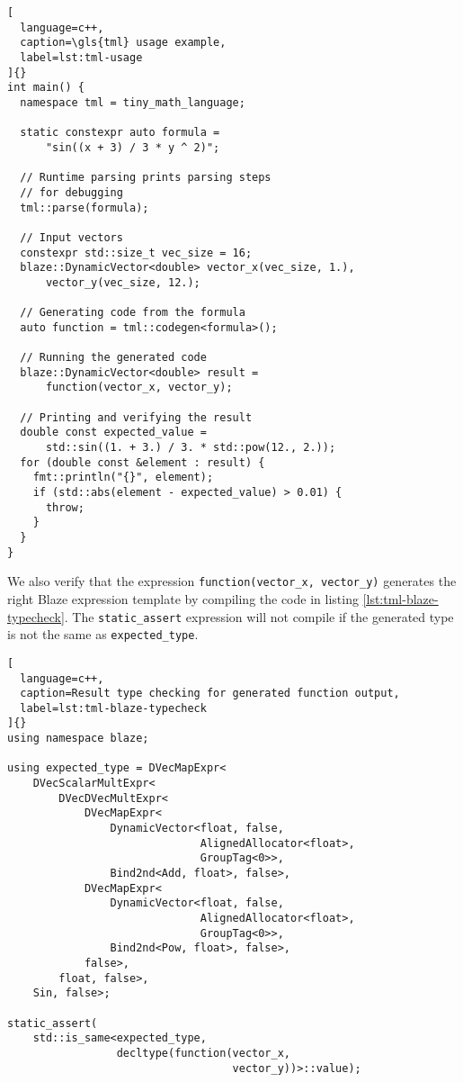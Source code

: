 \documentclass[../main]{subfiles}
\begin{document}
\begin{lstlisting}[
  language=c++,
  caption=\gls{tml} usage example,
  label=lst:tml-usage
]{}
int main() {
  namespace tml = tiny_math_language;

  static constexpr auto formula =
      "sin((x + 3) / 3 * y ^ 2)";

  // Runtime parsing prints parsing steps
  // for debugging
  tml::parse(formula);

  // Input vectors
  constexpr std::size_t vec_size = 16;
  blaze::DynamicVector<double> vector_x(vec_size, 1.),
      vector_y(vec_size, 12.);

  // Generating code from the formula
  auto function = tml::codegen<formula>();

  // Running the generated code
  blaze::DynamicVector<double> result =
      function(vector_x, vector_y);

  // Printing and verifying the result
  double const expected_value =
      std::sin((1. + 3.) / 3. * std::pow(12., 2.));
  for (double const &element : result) {
    fmt::println("{}", element);
    if (std::abs(element - expected_value) > 0.01) {
      throw;
    }
  }
}
\end{lstlisting}

We also verify that the expression \lstinline{function(vector_x, vector_y)}
generates the right Blaze expression template by compiling the code in
listing \ref{lst:tml-blaze-typecheck}. The \lstinline{static_assert}
expression will not compile if the generated type is not the same as
\lstinline{expected_type}.

\clearpage%

\begin{lstlisting}[
  language=c++,
  caption=Result type checking for generated function output,
  label=lst:tml-blaze-typecheck
]{}
using namespace blaze;

using expected_type = DVecMapExpr<
    DVecScalarMultExpr<
        DVecDVecMultExpr<
            DVecMapExpr<
                DynamicVector<float, false,
                              AlignedAllocator<float>,
                              GroupTag<0>>,
                Bind2nd<Add, float>, false>,
            DVecMapExpr<
                DynamicVector<float, false,
                              AlignedAllocator<float>,
                              GroupTag<0>>,
                Bind2nd<Pow, float>, false>,
            false>,
        float, false>,
    Sin, false>;

static_assert(
    std::is_same<expected_type,
                 decltype(function(vector_x,
                                   vector_y))>::value);
\end{lstlisting}
\end{document}
